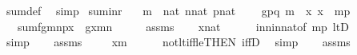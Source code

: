 \begin{isabellebody}
\ sum{\isacharunderscore}{\kern0pt}def\ \isamarkupfalse%
\ simp\isanewline
{}\isamarkupfalse%
%
\endisatagproof
{\isafoldproof}%
%
\isadelimproof
\isanewline
%
\endisadelimproof
\isanewline
{}\isamarkupfalse%
\ sum{\isacharunderscore}{\kern0pt}inr{\isacharcolon}{\kern0pt}\isanewline
\ \ \ {\isachardoublequoteopen}m\ {\isasymin}\ nat{\isachardoublequoteclose}\ {\isachardoublequoteopen}n{\isasymin}nat{\isachardoublequoteclose}\ {\isachardoublequoteopen}p{\isasymin}nat{\isachardoublequoteclose}\isanewline
\ \ \ \ {\isachardoublequoteopen}g{\isasymin}p{\isasymrightarrow}q{\isachardoublequoteclose}\ {\isachardoublequoteopen}m\ {\isasymle}\ x{\isachardoublequoteclose}\ {\isachardoublequoteopen}x\ {\isacharless}{\kern0pt}\ m{\isacharhash}{\kern0pt}{\isacharplus}{\kern0pt}p{\isachardoublequoteclose}\isanewline
\ \ \ {\isachardoublequoteopen}sum{\isacharparenleft}{\kern0pt}f{\isacharcomma}{\kern0pt}g{\isacharcomma}{\kern0pt}m{\isacharcomma}{\kern0pt}n{\isacharcomma}{\kern0pt}p{\isacharparenright}{\kern0pt}{\isacharbackquote}{\kern0pt}x\ {\isacharequal}{\kern0pt}\ g{\isacharbackquote}{\kern0pt}{\isacharparenleft}{\kern0pt}x{\isacharhash}{\kern0pt}{\isacharminus}{\kern0pt}m{\isacharparenright}{\kern0pt}{\isacharhash}{\kern0pt}{\isacharplus}{\kern0pt}n{\isachardoublequoteclose}\isanewline
%
\isadelimproof
%
\endisadelimproof
%
\isatagproof
{}\isamarkupfalse%
\ {\isacharminus}{\kern0pt}\isanewline
\ \ \isamarkupfalse%
\ assms\isanewline
\ \ \isamarkupfalse%
\ {\isachardoublequoteopen}x{\isasymin}nat{\isachardoublequoteclose}\isanewline
\ \ \ \ \isamarkupfalse%
\ in{\isacharunderscore}{\kern0pt}n{\isacharunderscore}{\kern0pt}in{\isacharunderscore}{\kern0pt}nat{\isacharbrackleft}{\kern0pt}of\ {\isachardoublequoteopen}m{\isacharhash}{\kern0pt}{\isacharplus}{\kern0pt}p{\isachardoublequoteclose}{\isacharbrackright}{\kern0pt}\ ltD\isanewline
\ \ \ \ \isamarkupfalse%
\ simp\isanewline
\ \ \isamarkupfalse%
\ assms\isanewline
\ \ \isamarkupfalse%
\ {\isachardoublequoteopen}{\isasymnot}\ x{\isacharless}{\kern0pt}m{\isachardoublequoteclose}\isanewline
\ \ \ \ \isamarkupfalse%
\ not{\isacharunderscore}{\kern0pt}lt{\isacharunderscore}{\kern0pt}iff{\isacharunderscore}{\kern0pt}le{\isacharbrackleft}{\kern0pt}THEN\ iffD{}{\isacharbrackright}{\kern0pt}\ \isamarkupfalse%
\ simp\isanewline
\ \ \isamarkupfalse%
\ assms\isanewline

\end{isabellebody}
